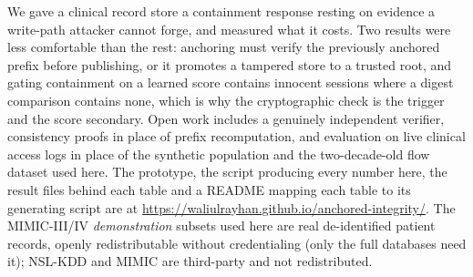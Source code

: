 \documentclass[conference]{IEEEtran}
\begin{document}
We gave a clinical record store a containment response resting on evidence a write-path attacker cannot forge,
and measured what it costs. Two results were less comfortable than the rest: anchoring must verify the previously
anchored prefix before publishing, or it promotes a tampered store to a trusted root, and gating containment on a
learned score contains innocent sessions where a digest comparison contains none, which is why the cryptographic
check is the trigger and the score secondary. Open work includes a genuinely independent verifier, consistency
proofs in place of prefix recomputation, and evaluation on live clinical access logs in place of the synthetic
population and the two-decade-old flow dataset used here. The prototype, the script producing every number here,
the result files behind each table and a README mapping each table to its generating script are at
\url{https://waliulrayhan.github.io/anchored-integrity/}. The MIMIC-III/IV
\emph{demonstration} subsets used here are real de-identified patient records, openly redistributable without
credentialing (only the full databases need it); NSL-KDD and MIMIC are third-party and not redistributed.
\end{document}
